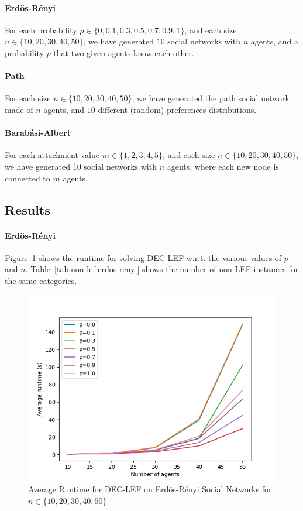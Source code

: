 \documentclass{article}
\begin{document}
\paragraph{Erd\"os-R\'enyi} For each probability $p \in \{0, 0.1, 0.3, 0.5, 0.7, 0.9, 1\}$, and each size $n \in \{10,20,30,40,50\}$, we have generated $10$ social networks with $n$ agents, and a probability $p$ that two given agents know each other.

\paragraph{Path} For each size $n \in \{10,20,30,40,50\}$, we have generated the path social network made of $n$ agents, and $10$ different (random) preferences distributions.

\paragraph{Barab\'asi-Albert} For each attachment value $m \in \{1,2,3,4,5\}$, and each size $n \in \{10,20,30,40,50\}$, we have generated $10$ social networks with $n$ agents, where each new node is connected to $m$ agents.

\subsection{Results}
\paragraph{Erd\"os-R\'enyi} Figure~\ref{fig:runtime-erdos-renyi} shows the runtime for solving DEC-LEF w.r.t. the various values of  $p$ and $n$. Table~\ref{tab:non-lef-erdos-renyi} shows the number of non-LEF instances for the same categories.

\begin{figure}[htb]
\centering
\includegraphics[width=0.5\linewidth]{results-runtime-ER.png}
\caption{Average Runtime for DEC-LEF on Erd\"os-R\'enyi Social Networks for $n \in \{10,20,30,40,50\}$\label{fig:runtime-erdos-renyi}}
\end{figure}
\end{document}
